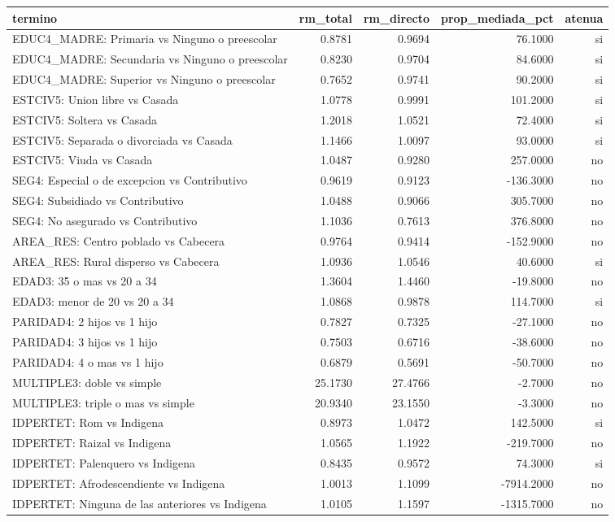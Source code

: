 \begin{tabular}{lrrrr}
\toprule
termino & rm\_total & rm\_directo & prop\_mediada\_pct & atenua \\
\midrule
EDUC4\_MADRE: Primaria vs Ninguno o preescolar & 0.8781 & 0.9694 & 76.1000 & si \\
EDUC4\_MADRE: Secundaria vs Ninguno o preescolar & 0.8230 & 0.9704 & 84.6000 & si \\
EDUC4\_MADRE: Superior vs Ninguno o preescolar & 0.7652 & 0.9741 & 90.2000 & si \\
ESTCIV5: Union libre vs Casada & 1.0778 & 0.9991 & 101.2000 & si \\
ESTCIV5: Soltera vs Casada & 1.2018 & 1.0521 & 72.4000 & si \\
ESTCIV5: Separada o divorciada vs Casada & 1.1466 & 1.0097 & 93.0000 & si \\
ESTCIV5: Viuda vs Casada & 1.0487 & 0.9280 & 257.0000 & no \\
SEG4: Especial o de excepcion vs Contributivo & 0.9619 & 0.9123 & -136.3000 & no \\
SEG4: Subsidiado vs Contributivo & 1.0488 & 0.9066 & 305.7000 & no \\
SEG4: No asegurado vs Contributivo & 1.1036 & 0.7613 & 376.8000 & no \\
AREA\_RES: Centro poblado vs Cabecera & 0.9764 & 0.9414 & -152.9000 & no \\
AREA\_RES: Rural disperso vs Cabecera & 1.0936 & 1.0546 & 40.6000 & si \\
EDAD3: 35 o mas vs 20 a 34 & 1.3604 & 1.4460 & -19.8000 & no \\
EDAD3: menor de 20 vs 20 a 34 & 1.0868 & 0.9878 & 114.7000 & si \\
PARIDAD4: 2 hijos vs 1 hijo & 0.7827 & 0.7325 & -27.1000 & no \\
PARIDAD4: 3 hijos vs 1 hijo & 0.7503 & 0.6716 & -38.6000 & no \\
PARIDAD4: 4 o mas vs 1 hijo & 0.6879 & 0.5691 & -50.7000 & no \\
MULTIPLE3: doble vs simple & 25.1730 & 27.4766 & -2.7000 & no \\
MULTIPLE3: triple o mas vs simple & 20.9340 & 23.1550 & -3.3000 & no \\
IDPERTET: Rom vs Indigena & 0.8973 & 1.0472 & 142.5000 & si \\
IDPERTET: Raizal vs Indigena & 1.0565 & 1.1922 & -219.7000 & no \\
IDPERTET: Palenquero vs Indigena & 0.8435 & 0.9572 & 74.3000 & si \\
IDPERTET: Afrodescendiente vs Indigena & 1.0013 & 1.1099 & -7914.2000 & no \\
IDPERTET: Ninguna de las anteriores vs Indigena & 1.0105 & 1.1597 & -1315.7000 & no \\
\bottomrule
\end{tabular}
